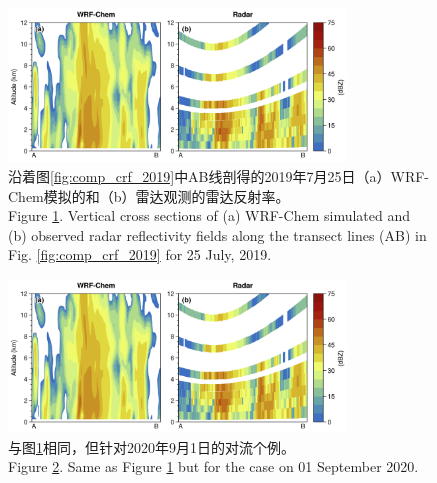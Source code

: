 \begin{figure}[htbp]
\centering
\includegraphics[width=0.8\textwidth]{./figures/comp_dbzcross_2019.png}
\caption{沿着图\ref{fig:comp_crf_2019}中AB线剖得的2019年7月25日（a）WRF-Chem模拟的和（b）雷达观测的雷达反射率。\\
Figure \ref{fig:comp_dbzcross_2019}. Vertical cross sections of (a) WRF-Chem simulated and (b) observed radar reflectivity fields along the transect lines (AB) in Fig. \ref{fig:comp_crf_2019} for 25 July, 2019.}
\label{fig:comp_dbzcross_2019}
\end{figure}

\begin{figure}[htbp]
\centering
\includegraphics[width=0.8\textwidth]{./figures/comp_dbzcross_2019.png}
\caption{与图\ref{fig:comp_dbzcross_2019}相同，但针对2020年9月1日的对流个例。\\
Figure \ref{fig:comp_dbzcross_2020}. Same as Figure \ref{fig:comp_dbzcross_2019} but for the case on 01 September 2020.}
\label{fig:comp_dbzcross_2020}
\end{figure}


